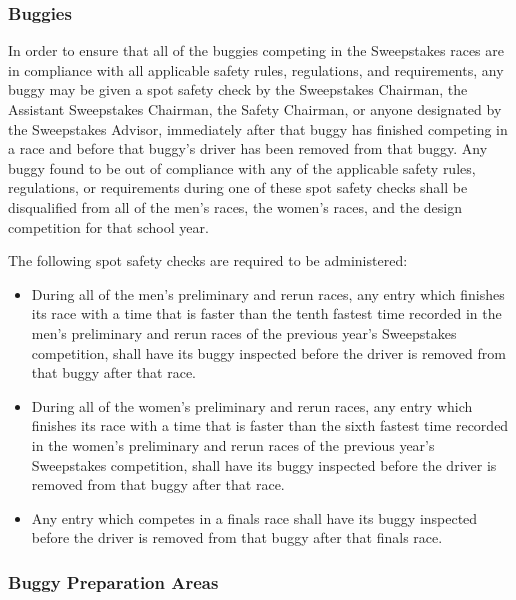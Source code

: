 \subsubsection{Buggies}

	In order to ensure that all of the buggies competing in the Sweepstakes races are in compliance with all applicable safety rules, regulations, and requirements, any buggy may be given a spot safety check by the Sweepstakes Chairman, the Assistant Sweepstakes Chairman, the Safety Chairman, or anyone designated by the Sweepstakes Advisor, immediately after that buggy has finished competing in a race and before that buggy's driver has been removed from that buggy. Any buggy found to be out of compliance with any of the applicable safety rules, regulations, or requirements during one of these spot safety checks shall be disqualified from all of the men's races, the women's races, and the design competition for that school year.
	\newline

	\noindent The following spot safety checks are required to be administered:

	\begin{itemize}

		\item
		During all of the men's preliminary and rerun races, any entry which finishes its race with a time that is faster than the tenth fastest time recorded in the men's preliminary and rerun races of the previous year's Sweepstakes competition, shall have its buggy inspected before the driver is removed from that buggy after that race.

		\item
		During all of the women's preliminary and rerun races, any entry which finishes its race with a time that is faster than the sixth fastest time recorded in the women's preliminary and rerun races of the previous year's Sweepstakes competition, shall have its buggy inspected before the driver is removed from that buggy after that race.

		\item
		Any entry which competes in a finals race shall have its buggy inspected before the driver is removed from that buggy after that finals race.

	\end{itemize}

\subsubsection{Buggy Preparation Areas}
\label{subsec:Buggy Prep}

